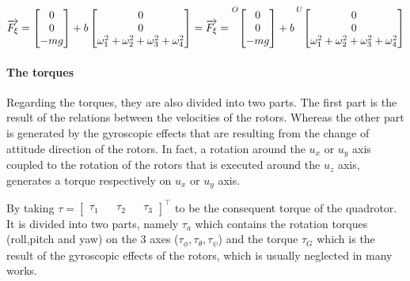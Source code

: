 \documentclass{thesisreport}
\begin{document}
\begin{equation}
\overrightarrow{F_{\xi}}  = \begin{bmatrix}
0 \\
0 \\
-mg \\
\end{bmatrix} 
+ 
b \begin{bmatrix}
0 \\ 
0 \\
\omega_1^2 + \omega_2^2 + \omega_3^2 + \omega_4^2\\
\end{bmatrix}=
\overrightarrow{F_{\xi}}  =  
\prescript{O}{}{\begin{bmatrix}
0 \\
0 \\
-mg \\
\end{bmatrix}}
+ b \prescript{U}{}{\begin{bmatrix}
0 \\ 
0 \\
\omega_1^2 + \omega_2^2 + \omega_3^2 + \omega_4^2\\
\end{bmatrix}}
\end{equation}








\newpage

\paragraph{The torques}
Regarding the torques, they are also divided into two parts. The first part is the result of the relations between the velocities of the rotors. Whereas the other part is generated by the gyroscopic effects that are resulting from the change of attitude direction of the rotors. In fact, a rotation around the $u_x$ or $u_y$ axis coupled to the rotation of the rotors that is executed around the $u_z$ axis, generates a torque respectively on $u_x$ or $u_y$ axis.

By taking $\tau=\begin{bmatrix}
\tau_1 && \tau_2 && \tau_3 
\end{bmatrix}^{\intercal}$ to be the consequent torque of the quadrotor. It is divided into two parts, namely $\tau_a$ which contains the rotation torques (roll,pitch and yaw) on the 3 axes ($\tau_{\phi}, \tau_{\theta}, \tau_{\psi}$) and the torque $\tau_G$ which is the result of the gyroscopic effects of the rotors, which is usually neglected in many works.
\end{document}
